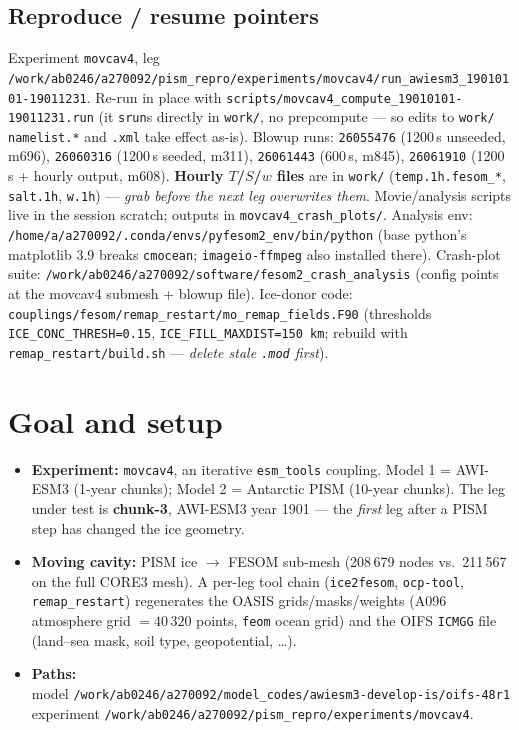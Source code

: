 \documentclass[11pt,a4paper]{article}
\newcommand{\code}[1]{\texttt{\small #1}}
\newcommand{\file}[1]{\texttt{\footnotesize #1}}
\begin{document}
\subsection{Reproduce / resume pointers}\label{sec:iceseed}
Experiment \code{movcav4}, leg
\file{/work/ab0246/a270092/pism\_repro/experiments/movcav4/run\_awiesm3\_19010101-19011231}.
Re-run in place with \file{scripts/movcav4\_compute\_19010101-19011231.run} (it \code{srun}s
directly in \file{work/}, no prepcompute --- so edits to \file{work/} \code{namelist.*} and
\code{*.xml} take effect as-is). Blowup runs: \code{26055476} (1200\,s unseeded, m696),
\code{26060316} (1200\,s seeded, m311), \code{26061443} (600\,s, m845), \code{26061910}
(1200\,s + hourly output, m608). \textbf{Hourly $T$/$S$/$w$ files} are in \file{work/}
(\code{temp.1h.fesom\_*}, \code{salt.1h}, \code{w.1h}) --- \emph{grab before the next leg
overwrites them}. Movie/analysis scripts live in the session scratch; outputs in
\file{movcav4\_crash\_plots/}. Analysis env:
\code{/home/a/a270092/.conda/envs/pyfesom2\_env/bin/python} (base python's matplotlib 3.9
breaks \code{cmocean}; \code{imageio-ffmpeg} also installed there). Crash-plot suite:
\file{/work/ab0246/a270092/software/fesom2\_crash\_analysis} (config points at the movcav4
submesh + blowup file). Ice-donor code:
\file{couplings/fesom/remap\_restart/mo\_remap\_fields.F90} (thresholds
\code{ICE\_CONC\_THRESH=0.15}, \code{ICE\_FILL\_MAXDIST=150\,km}; rebuild with
\file{remap\_restart/build.sh} --- \emph{delete stale \code{*.mod} first}).

\section{Goal and setup}
\begin{itemize}[leftmargin=1.4em,itemsep=1pt]
  \item \textbf{Experiment:} \code{movcav4}, an iterative \code{esm\_tools} coupling.
        Model 1 = AWI-ESM3 (1-year chunks); Model 2 = Antarctic PISM (10-year chunks).
        The leg under test is \textbf{chunk-3}, AWI-ESM3 year 1901 --- the \emph{first}
        leg after a PISM step has changed the ice geometry.
  \item \textbf{Moving cavity:} PISM ice $\to$ FESOM sub-mesh
        (208\,679 nodes vs.\ 211\,567 on the full CORE3 mesh). A per-leg tool chain
        (\code{ice2fesom}, \code{ocp-tool}, \code{remap\_restart}) regenerates the OASIS
        grids/masks/weights (A096 atmosphere grid $=40\,320$ points, \code{feom} ocean
        grid) and the OIFS \code{ICMGG} file (land--sea mask, soil type, geopotential,
        \dots).
  \item \textbf{Paths:}\\
        model \file{/work/ab0246/a270092/model\_codes/awiesm3-develop-is/oifs-48r1}\\
        experiment \file{/work/ab0246/a270092/pism\_repro/experiments/movcav4}.
\end{itemize}
\end{document}
